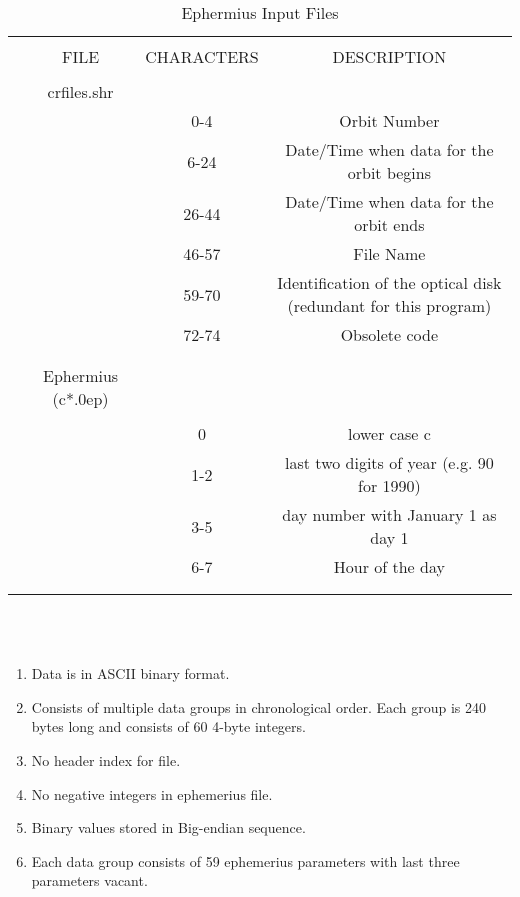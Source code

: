 \begin{table}
\caption{Ephermius Input Files}
\begin{tabular}{lccc}  
\hline
 &\\
&FILE	&CHARACTERS	&DESCRIPTION \\ 
 &\\ 
\hline
&crfiles.shr \\

& &0-4	&Orbit Number\\

 & &6-24	&Date/Time when data for the orbit begins\\

&&26-44	&Date/Time when data for the orbit ends\\

&&46-57	&File Name\\

&&59-70	&Identification of the optical disk (redundant for this program)\\

&&72-74	&Obsolete code\\
&\\

\hline
&\\
&Ephermius (c*.0ep) \\
&\\
&&0 		&lower case c\\

&&1-2		&last two digits of year (e.g. 90 for 1990)\\

&&3-5		&day number with January 1 as day 1 \\

&&6-7		&Hour of the day\\
&\\
\hline
&\\
\end{tabular}  
\end{table}
\\


\\
\begin{enumerate}
\item Data is in ASCII binary format.
\item Consists of multiple data groups in chronological order. Each group is 240 bytes long and consists of 60 4-byte integers.
\item No header index for file.
\item No negative integers in ephemerius file.
\item Binary values stored in Big-endian sequence.
\item Each data group consists of 59 ephemerius parameters with last three parameters vacant.
\end{enumerate}
\\

